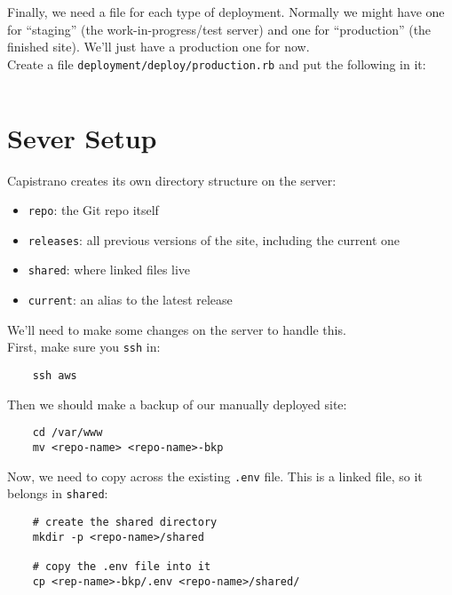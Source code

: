Finally, we need a file for each type of deployment. Normally we might have one for ``staging'' (the work-in-progress/test server) and one for ``production'' (the finished site). We'll just have a production one for now.
\\

Create a file \texttt{deployment/deploy/production.rb} and put the following in it:

\inputminted{ruby}{04/resources/02/04-production.rb}


\section{Sever Setup}

Capistrano creates its own directory structure on the server:

\begin{itemize}
    \item \texttt{repo}: the Git repo itself
    \item \texttt{releases}: all previous versions of the site, including the current one
    \item \texttt{shared}: where linked files live
    \item \texttt{current}: an alias to the latest release
\end{itemize}

We'll need to make some changes on the server to handle this.
\\

First, make sure you \texttt{ssh} in:

\begin{verbatim}
    ssh aws
\end{verbatim}

Then we should make a backup of our manually deployed site:

\begin{verbatim}
    cd /var/www
    mv <repo-name> <repo-name>-bkp
\end{verbatim}

Now, we need to copy across the existing \texttt{.env} file. This is a linked file, so it belongs in \texttt{shared}:

\begin{verbatim}
    # create the shared directory
    mkdir -p <repo-name>/shared

    # copy the .env file into it
    cp <rep-name>-bkp/.env <repo-name>/shared/
\end{verbatim}

